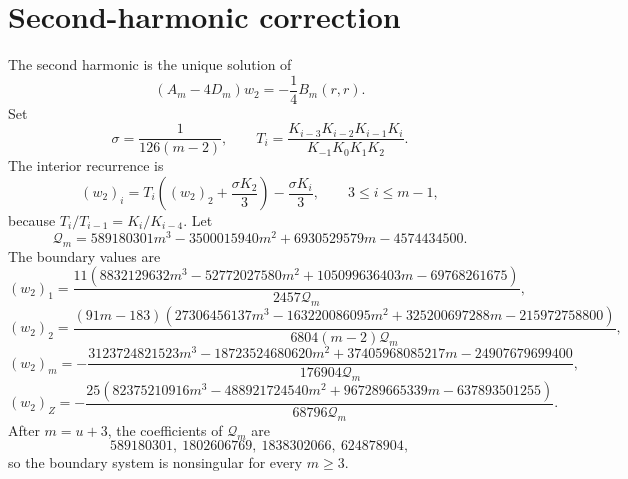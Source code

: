 \section*{Second-harmonic correction}
The second harmonic is the unique solution of
\[
(A_m-4D_m)w_2=-\frac14B_m(r,r).
\]
Set
\[
\sigma=\frac1{126(m-2)},
\qquad
T_i=\frac{K_{i-3}K_{i-2}K_{i-1}K_i}{K_{-1}K_0K_1K_2}.
\]
The interior recurrence is
\[
(w_2)_i=T_i\left((w_2)_2+\frac{\sigma K_2}{3}\right)
-\frac{\sigma K_i}{3},
\qquad 3\le i\le m-1,
\]
because $T_i/T_{i-1}=K_i/K_{i-4}$.  Let
\[
\mathcal Q_m=589180301m^3-3500015940m^2+6930529579m-4574434500.
\]
The boundary values are
\[
(w_2)_1=\frac{11(8832129632m^3-52772027580m^2+105099636403m-69768261675)}{2457\mathcal Q_m},
\]
\[
(w_2)_2=\frac{(91m-183)(27306456137m^3-163220086095m^2+325200697288m-215972758800)}{6804(m-2)\mathcal Q_m},
\]
\[
(w_2)_m=-\frac{3123724821523m^3-18723524680620m^2+37405968085217m-24907679699400}{176904\mathcal Q_m},
\]
\[
(w_2)_Z=-\frac{25(82375210916m^3-488921724540m^2+967289665339m-637893501255)}{68796\mathcal Q_m}.
\]
After $m=u+3$, the coefficients of $\mathcal Q_m$ are
\[
589180301,\ 1802606769,\ 1838302066,\ 624878904,
\]
so the boundary system is nonsingular for every $m\ge3$.
